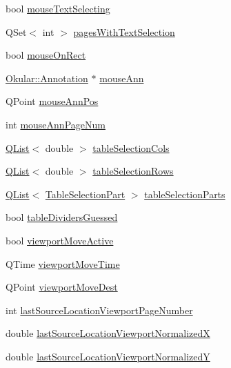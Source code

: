 \begin{DoxyCompactItemize}
bool \hyperlink{classPageViewPrivate_a64e9f3610cf2b731a3c0c4eae976e687}{mouse\+Text\+Selecting}
\item 
Q\+Set$<$ int $>$ \hyperlink{classPageViewPrivate_ad82b596dc262e93c2268297b9eee8956}{pages\+With\+Text\+Selection}
\item 
bool \hyperlink{classPageViewPrivate_af6568bdd2ef97bb2c81a71961923ee4d}{mouse\+On\+Rect}
\item 
\hyperlink{classOkular_1_1Annotation}{Okular\+::\+Annotation} $\ast$ \hyperlink{classPageViewPrivate_ac92373de9a9cb5f2085b186a7e321a3b}{mouse\+Ann}
\item 
Q\+Point \hyperlink{classPageViewPrivate_a1cc45a684f1f05e522c4874d017858cb}{mouse\+Ann\+Pos}
\item 
int \hyperlink{classPageViewPrivate_a6e1d17de5ec97192d937dae41c89ff74}{mouse\+Ann\+Page\+Num}
\item 
\hyperlink{classQList}{Q\+List}$<$ double $>$ \hyperlink{classPageViewPrivate_a9d6389f129073d1af9973814a2b1d418}{table\+Selection\+Cols}
\item 
\hyperlink{classQList}{Q\+List}$<$ double $>$ \hyperlink{classPageViewPrivate_afa6ab874498223c0f7788831a67ef007}{table\+Selection\+Rows}
\item 
\hyperlink{classQList}{Q\+List}$<$ \hyperlink{structTableSelectionPart}{Table\+Selection\+Part} $>$ \hyperlink{classPageViewPrivate_aec476c0b74867740803d4ba34393b154}{table\+Selection\+Parts}
\item 
bool \hyperlink{classPageViewPrivate_a2ceb798d9b9f218e6acc3769d01102f4}{table\+Dividers\+Guessed}
\item 
bool \hyperlink{classPageViewPrivate_acc47dfc95cad4f126c4dbd3e8f31e43b}{viewport\+Move\+Active}
\item 
Q\+Time \hyperlink{classPageViewPrivate_a90cdedb649dd9a15775a0157c0bc76da}{viewport\+Move\+Time}
\item 
Q\+Point \hyperlink{classPageViewPrivate_ae9cc8ec67277ed3904a0cad6108d2a7a}{viewport\+Move\+Dest}
\item 
int \hyperlink{classPageViewPrivate_a12f794c9556da941d62030f41e37ea87}{last\+Source\+Location\+Viewport\+Page\+Number}
\item 
double \hyperlink{classPageViewPrivate_ada1e593e53f5fe775184f97ec3b1bbc7}{last\+Source\+Location\+Viewport\+Normalized\+X}
\item 
double \hyperlink{classPageViewPrivate_af9fd59edb9afe621534cfb8086fc95ab}{last\+Source\+Location\+Viewport\+Normalized\+Y}
\item 

\end{DoxyCompactItemize}
